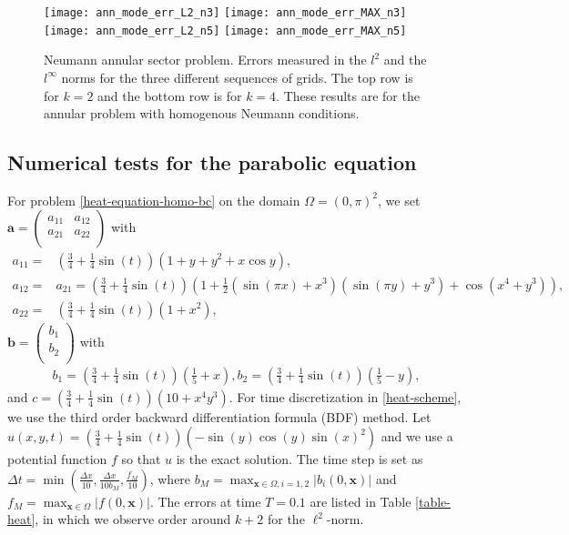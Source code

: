 \documentclass[onefignum,onetabnum]{siamart171218}
\begin{document}
\begin{figure}[htb]
\begin{center}
\texttt{[image: ann\_mode\_err\_L2\_n3]}
\texttt{[image: ann\_mode\_err\_MAX\_n3]}
\texttt{[image: ann\_mode\_err\_L2\_n5]}
\texttt{[image: ann\_mode\_err\_MAX\_n5]}
\caption{Neumann annular sector problem. Errors measured in the $l^2$ and the $l^\infty$ norms for the three different sequences of grids. The top row is for $k=2$ and the bottom row is for $k=4$. These results are for the annular problem with homogenous Neumann conditions. \label{fig:ann_mode_errs}}
\end{center}
\end{figure}	



\subsection{Numerical tests for the parabolic equation}
For problem \eqref{heat-equation-homo-bc} on the domain $\Omega = (0,\pi)^2$, we set $\mathbf a=\left( {\begin{array}{cc}
   a_{11} & a_{12} \\
   a_{21} & a_{22} \\
  \end{array} } \right)$ with 
\begin{equation*}
\begin{aligned}  
  a_{11} =& \left(\frac34 + \frac14 \sin(t)\right)\left(1+y+y^2+x\cos{y}\right),\\
  a_{12} =& a_{21}=\left(\frac34 + \frac14 \sin(t)\right)\left(1+\frac12(\sin(\pi x)+x^3)(\sin(\pi y)+y^3)+\cos(x^4+y^3)\right),\\
  a_{22} =&\left(\frac34 + \frac14 \sin(t)\right)\left(1+x^2\right),
  \end{aligned} 
  \end{equation*}
   $\mathbf b=\left( {\begin{array}{cc}
   b_{1} \\
   b_{2} \\
  \end{array} } \right)$ with 
  \begin{equation*}
\begin{aligned}  
b_{1}=\left(\frac34 + \frac14 \sin(t)\right)\left(\frac15+x\right),  
b_{2}=\left(\frac34 + \frac14 \sin(t)\right)\left(\frac15-y\right), 
    \end{aligned} 
  \end{equation*}
and $c = \left(\frac34 + \frac14 \sin(t)\right)\left(10+x^4y^3\right)$. For time discretization in \eqref{heat-scheme}, we use the third order backward differentiation formula (BDF) method. 
  Let $u(x,y,t) = (\frac34 + \frac14 \sin(t))(-\sin(y)\cos(y)\sin(x)^2)$ and we use a potential function $f$ so that $u$ is the exact solution. The time step is set as $\Delta t = \min(\frac{\Delta x}{10}, \frac{\Delta x}{10b_M}, \frac{f_M}{10})$, where $b_M = \max_{\mathbf{x}\in \Omega, i = 1,2}|b_{i}(0,\mathbf{x})|$ and $f_M = \max_{\mathbf{x}\in \Omega}|f(0,\mathbf{x})|$. The errors at time $T = 0.1$ are listed in Table \ref{table-heat}, in which we observe order around $k+2$ for the $\ell^2$-norm.
  
\end{document}
